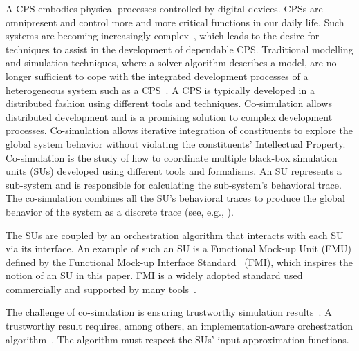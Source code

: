  

A CPS embodies physical processes controlled by digital devices.
CPSs are omnipresent and control more and more critical functions in our daily life.
Such systems are becoming increasingly complex~\cite{4519604}, which leads to the desire for techniques to assist in the development of dependable CPS.
Traditional modelling and simulation techniques, where a solver algorithm describes a model, are no longer sufficient to cope with the integrated development processes of a heterogeneous system such as a CPS~\cite{FMI2014}.
A CPS is typically developed in a distributed fashion using different tools and techniques. 
Co-simulation allows distributed development and is a promising solution to complex development processes.
Co-simulation allows iterative integration of constituents to explore the global system behavior without violating the constituents' Intellectual Property. 
Co-simulation is the study of how to coordinate multiple black-box simulation units (SUs) developed using different tools and formalisms.
An SU represents a sub-system and is responsible for calculating the sub-system's behavioral trace.
The co-simulation combines all the SU's behavioral traces to produce the global behavior of the system as a discrete trace (see, e.g., \cite{Kubler2000,Gomes2018}).

The SUs are coupled by an orchestration algorithm that interacts with each SU via its interface.
An example of such an SU is a Functional Mock-up Unit (FMU) defined by the Functional Mock-up Interface Standard~\cite{FMI2014} (FMI), which inspires the notion of an SU in this paper. FMI is a widely adopted standard used commercially and supported by many tools~\cite{Tools_FMI}.

The challenge of co-simulation is ensuring trustworthy simulation results~\cite{Gomes2018}. 
A trustworthy result requires, among others, an implementation-aware orchestration algorithm~\cite{Gomes2019,Oakes2021,Gomes2018f,Schweizer2015c,hansen_verification_2021}.
The algorithm must respect the SUs' input approximation functions.

